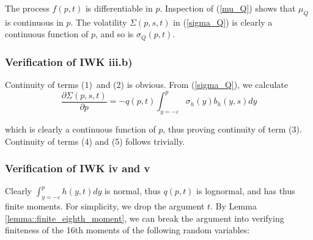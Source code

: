 \documentclass{article}
\begin{document}
The process $f(p,t)$ is differentiable in $p$. Inspection of (\ref{mu_Q})
shows that $\mu _{Q}$ is continuous in $p$. The volatility $\Sigma (p,s,t)$
in (\ref{sigma_Q}) is clearly a continuous function of $p$, and so is $%
\sigma _{Q}(p,t)$.

\subsubsection{Verification of IWK iii.b)}

Continuity of terms (1)\ and (2) is obvious. From (\ref{sigma_Q}), we
calculate
\begin{equation}
\frac{\partial \Sigma (p,s,t)}{\partial p}=-q{(p,t)}\int_{y=-\varepsilon
}^{p}\sigma _{h}(y)b_{h}(y,s)dy  \label{dsigmadp_thefirst}
\end{equation}

which is clearly a continuous function of $p$, thus proving continuity of
term (3). Continuity of terms (4) and (5) follows trivially.

\subsubsection{Verification of IWK iv and v}

Clearly ${\int_{y=-\varepsilon }^{p}h(y,t)dy}$ is normal, thus $q(p,t)$ is
lognormal, and has thus finite moments. For simplicity, we drop the argument
$t$. By Lemma \ref{lemma::finite_eighth_moment}, we can break the argument
into verifying finiteness of the 16th moments of the following random
variables:
\end{document}
